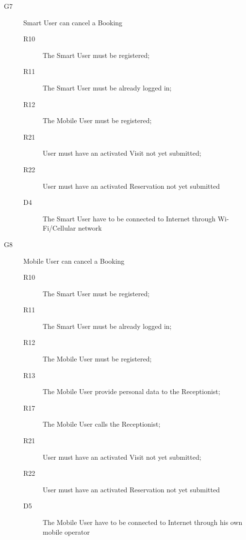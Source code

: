 \begin{description}
    \item[G7]Smart User can cancel a Booking
    \begin{description}
    \item[R10] The Smart User must be registered;
    \item[R11] The Smart User must be already logged in;
    \item[R12] The Mobile User must be registered; %
    \item[R21] User must have an activated Visit not yet submitted;
    \item[R22] User must have an activated Reservation not yet submitted
    \item[D4] The Smart User have to be connected to Internet through Wi-Fi/Cellular network
    \end{description}
    
    \item[G8]Mobile User can cancel a Booking
    \begin{description}
    \item[R10] The Smart User must be registered;
    \item[R11] The Smart User must be already logged in;
    \item[R12] The Mobile User must be registered; %
    \item[R13] The Mobile User provide personal data to the Receptionist; %
    \item[R17] The Mobile User calls the Receptionist;
    \item[R21] User must have an activated Visit not yet submitted;
    \item[R22] User must have an activated Reservation not yet submitted
    \item[D5] The Mobile User have to be connected to Internet through his own mobile operator
    \end{description}
    
    
\end{description}


